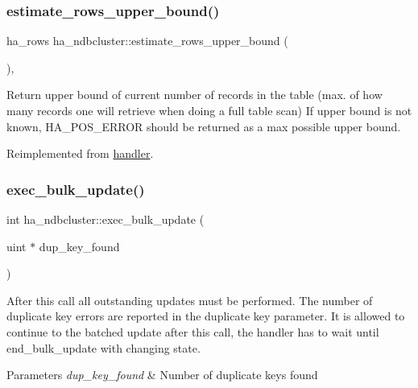 \subsubsection{\texorpdfstring{estimate\+\_\+rows\+\_\+upper\+\_\+bound()}{estimate\_rows\_upper\_bound()}}
{\footnotesize\ttfamily ha\+\_\+rows ha\+\_\+ndbcluster\+::estimate\+\_\+rows\+\_\+upper\+\_\+bound (\begin{DoxyParamCaption}{ }\end{DoxyParamCaption})\hspace{0.3cm}{\ttfamily [inline]}, {\ttfamily [virtual]}}

Return upper bound of current number of records in the table (max. of how many records one will retrieve when doing a full table scan) If upper bound is not known, H\+A\+\_\+\+P\+O\+S\+\_\+\+E\+R\+R\+OR should be returned as a max possible upper bound. 

Reimplemented from \mbox{\hyperlink{classhandler_ae59e9a1d36d852f4dd5dd00bff5f1ae4}{handler}}.

\mbox{\label{classha__ndbcluster_a5c9f552924c7168373ab0d1c2ba0e049}} 
\subsubsection{\texorpdfstring{exec\+\_\+bulk\+\_\+update()}{exec\_bulk\_update()}}
{\footnotesize\ttfamily int ha\+\_\+ndbcluster\+::exec\+\_\+bulk\+\_\+update (\begin{DoxyParamCaption}\item[{uint $\ast$}]{dup\+\_\+key\+\_\+found }\end{DoxyParamCaption})\hspace{0.3cm}{\ttfamily [virtual]}}

After this call all outstanding updates must be performed. The number of duplicate key errors are reported in the duplicate key parameter. It is allowed to continue to the batched update after this call, the handler has to wait until end\+\_\+bulk\+\_\+update with changing state.


\begin{DoxyParams}{Parameters}
{\em dup\+\_\+key\+\_\+found} & Number of duplicate keys found\\
\hline
\end{DoxyParams}

